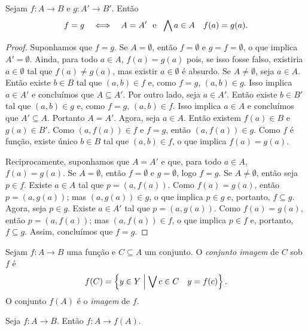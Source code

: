 \begin{proposition}\label{conj:prop.func.ig}
Sejam $f: A \to B$ e $g:A' \to B'$. Então
	\begin{equation*}
	f=g \quad \Longleftrightarrow \quad A=A' \text{\ \ e\ \ } \bigwedge\nolimits a \in A \quad f(a)=g(a).
	\end{equation*}
\end{proposition}
\begin{proof}
Suponhamos que $f=g$. Se $A=\emptyset$, então $f=\emptyset$ e $g=f=\emptyset$, o que implica $A'=\emptyset$. Ainda, para todo $a \in A$, $f(a)=g(a)$ pois, se isso fosse falso, existiria $a \in \emptyset$ tal que $f(a)\neq g(a)$, mas existir $a \in \emptyset$ é absurdo. Se $A \neq \emptyset$, seja $a \in A$. Então existe $b \in B$ tal que $(a,b) \in f$ e, como $f=g$, $(a,b) \in g$. Isso implica $a \in A'$ e concluímos que $A \subseteq A'$. Por outro lado, seja $a \in A'$. Então existe $b \in B'$ tal que $(a,b) \in g$ e, como $f=g$, $(a,b) \in f$. Isso implica $a \in A$ e concluímos que $A' \subseteq A$. Portanto $A=A'$. Agora, seja $a \in A$. Então existem $f(a) \in B$ e $g(a) \in B'$. Como $(a,f(a)) \in f$ e $f=g$, então $(a,f(a)) \in g$. Como $f$ é função, existe único $b \in B$ tal que $(a,b) \in f$, o que implica $f(a)=g(a)$.
	
Reciprocamente, suponhamos que $A=A'$ e que, para todo $a \in A$, $f(a)=g(a)$. Se $A=\emptyset$, então $f=\emptyset$ e $g=\emptyset$, logo $f=g$. Se $A \neq \emptyset$, então seja $p \in f$. Existe $a \in A$ tal que $p=(a,f(a))$. Como $f(a)=g(a)$, então $p=(a,g(a))$; mas $(a,g(a)) \in g$, o que implica $p \in g$ e, portanto, $f \subseteq g$. Agora, seja $p \in g$. Existe $a \in A'$ tal que $p=(a,g(a))$. Como $f(a)=g(a)$, então $p=(a,f(a))$; mas $(a,f(a)) \in f$, o que implica $p \in f$ e, portanto, $f \subseteq g$. Assim, concluímos que $f=g$.
\end{proof}

\begin{definition}
Sejam $f: A \to B$ uma função e $C \subseteq A$ um conjunto. O \emph{conjunto imagem} de $C$ sob $f$ é
	\begin{equation*}
	f(C)=\left\{{y \in Y}\;\middle\vert\;{\bigvee\nolimits c \in C \quad y=f(c)}\right\}.
	\end{equation*}
O conjunto $f(A)$ é o \emph{imagem} de $f$.
\end{definition}

\begin{proposition}
Seja $f: A \to B$. Então $f: A \to f(A)$.
\end{proposition}

